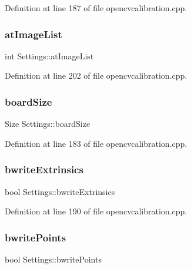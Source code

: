 Definition at line 187 of file opencvcalibration.\+cpp.

\mbox{\label{classSettings_a80061aedf354e63cb6c4c1fb7c4a9055}} 
\subsubsection{\texorpdfstring{atImageList}{atImageList}}
{\footnotesize\ttfamily int Settings\+::at\+Image\+List}



Definition at line 202 of file opencvcalibration.\+cpp.

\mbox{\label{classSettings_a5030a7164df923bb3b86dd7a0fc9af30}} 
\subsubsection{\texorpdfstring{boardSize}{boardSize}}
{\footnotesize\ttfamily Size Settings\+::board\+Size}



Definition at line 183 of file opencvcalibration.\+cpp.

\mbox{\label{classSettings_af1ac412d660e25aea698c76fa88de57c}} 
\subsubsection{\texorpdfstring{bwriteExtrinsics}{bwriteExtrinsics}}
{\footnotesize\ttfamily bool Settings\+::bwrite\+Extrinsics}



Definition at line 190 of file opencvcalibration.\+cpp.

\mbox{\label{classSettings_ab4aac97bdb5696d60b35a29c26497064}} 
\subsubsection{\texorpdfstring{bwritePoints}{bwritePoints}}
{\footnotesize\ttfamily bool Settings\+::bwrite\+Points}



